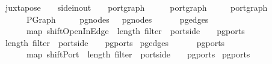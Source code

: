 \ juxtapose\ {\isacharcolon}{\isacharcolon}\ {\isachardoublequoteopen}{\isacharparenleft}\ {\isacharcolon}{\isacharcolon}\ side{\isacharunderscore}in{\isacharunderscore}out{\isacharcomma}\ \ \ \ port{\isacharunderscore}graph\ {\isasymRightarrow}\ {\isacharparenleft}\ \ \ \ port{\isacharunderscore}graph\isanewline
{}\ {\isacharparenleft}\ \ \ \ port{\isacharunderscore}graph{\isachardoublequoteclose}\isanewline
\ \ \ {\isachardoublequoteopen}\ \ {\isacharequal}\ PGraph\isanewline
\ \ \ \ {\isacharparenleft}\ pg{\isacharunderscore}nodes\ \ {\isacharat}\ pg{\isacharunderscore}nodes\ \isanewline
\ \ \ \ {\isacharparenleft}\ pg{\isacharunderscore}edges\ \ {\isacharat}\isanewline
\ \ \ \ \ \ map\ {\isacharparenleft}shiftOpenInEdge\ {\isacharparenleft}{\isasymlambda}\ length\ {\isacharparenleft}filter\ {\isacharparenleft}{\isasymlambda}\ port{\isachardot}side\ \ {\isacharequal}\ \ {\isacharparenleft}pg{\isacharunderscore}ports\   \isanewline
{}\ length\ {\isacharparenleft}filter\ {\isacharparenleft}{\isasymlambda}\ port{\isachardot}side\ \ {\isacharequal}\ \ {\isacharparenleft}pg{\isacharunderscore}ports\   \isanewline
{}pg{\isacharunderscore}edges\ \isanewline
\ \ \ \ {\isacharparenleft}\ pg{\isacharunderscore}ports\ \ {\isacharat}\isanewline
\ \ \ \ \ \ map\ {\isacharparenleft}shiftPort\ {\isacharparenleft}{\isasymlambda}\ length\ {\isacharparenleft}filter\ {\isacharparenleft}{\isasymlambda}\ port{\isachardot}side\ \ {\isacharequal}\ \ {\isacharparenleft}pg{\isacharunderscore}ports\ \isanewline
{}pg{\isacharunderscore}ports\ %
